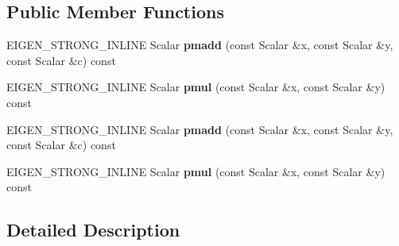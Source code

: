 \subsection*{Public Member Functions}
\begin{DoxyCompactItemize}
\item 
\mbox{\label{struct_eigen_1_1internal_1_1conj__helper_3_01std_1_1complex_3_01_real_scalar_01_4_00_01std_1_1co7e279017f32d052cf58f01f1590ee000_a7bffa756d3773120e9896fe170b2e805}} 
E\+I\+G\+E\+N\+\_\+\+S\+T\+R\+O\+N\+G\+\_\+\+I\+N\+L\+I\+NE Scalar {\bfseries pmadd} (const Scalar \&x, const Scalar \&y, const Scalar \&c) const
\item 
\mbox{\label{struct_eigen_1_1internal_1_1conj__helper_3_01std_1_1complex_3_01_real_scalar_01_4_00_01std_1_1co7e279017f32d052cf58f01f1590ee000_afd1abfeac0df0619345e5e0e58a31782}} 
E\+I\+G\+E\+N\+\_\+\+S\+T\+R\+O\+N\+G\+\_\+\+I\+N\+L\+I\+NE Scalar {\bfseries pmul} (const Scalar \&x, const Scalar \&y) const
\item 
\mbox{\label{struct_eigen_1_1internal_1_1conj__helper_3_01std_1_1complex_3_01_real_scalar_01_4_00_01std_1_1co7e279017f32d052cf58f01f1590ee000_a7bffa756d3773120e9896fe170b2e805}} 
E\+I\+G\+E\+N\+\_\+\+S\+T\+R\+O\+N\+G\+\_\+\+I\+N\+L\+I\+NE Scalar {\bfseries pmadd} (const Scalar \&x, const Scalar \&y, const Scalar \&c) const
\item 
\mbox{\label{struct_eigen_1_1internal_1_1conj__helper_3_01std_1_1complex_3_01_real_scalar_01_4_00_01std_1_1co7e279017f32d052cf58f01f1590ee000_afd1abfeac0df0619345e5e0e58a31782}} 
E\+I\+G\+E\+N\+\_\+\+S\+T\+R\+O\+N\+G\+\_\+\+I\+N\+L\+I\+NE Scalar {\bfseries pmul} (const Scalar \&x, const Scalar \&y) const
\end{DoxyCompactItemize}


\subsection{Detailed Description}
